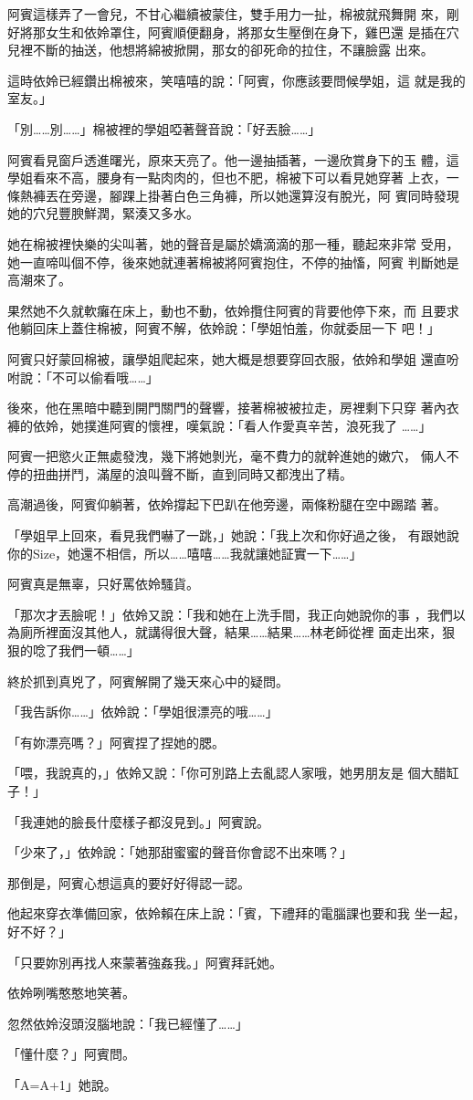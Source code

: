阿賓這樣弄了一會兒，不甘心繼續被蒙住，雙手用力一扯，棉被就飛舞開
來，剛好將那女生和依姈罩住，阿賓順便翻身，將那女生壓倒在身下，雞巴還
是插在穴兒裡不斷的抽送，他想將綿被掀開，那女的卻死命的拉住，不讓臉露
出來。

這時依姈已經鑽出棉被來，笑嘻嘻的說：「阿賓，你應該要問候學姐，這
就是我的室友。」

「別……別……」棉被裡的學姐啞著聲音說：「好丟臉……」

阿賓看見窗戶透進曙光，原來天亮了。他一邊抽插著，一邊欣賞身下的玉
體，這學姐看來不高，腰身有一點肉肉的，但也不肥，棉被下可以看見她穿著
上衣，一條熱褲丟在旁邊，腳踝上掛著白色三角褲，所以她還算沒有脫光，阿
賓同時發現她的穴兒豐腴鮮潤，緊湊又多水。

她在棉被裡快樂的尖叫著，她的聲音是屬於嬌滴滴的那一種，聽起來非常
受用，她一直啼叫個不停，後來她就連著棉被將阿賓抱住，不停的抽慉，阿賓
判斷她是高潮來了。

果然她不久就軟癱在床上，動也不動，依姈攬住阿賓的背要他停下來，而
且要求他躺回床上蓋住棉被，阿賓不解，依姈說：「學姐怕羞，你就委屈一下
吧！」

阿賓只好蒙回棉被，讓學姐爬起來，她大概是想要穿回衣服，依姈和學姐
還直吩咐說：「不可以偷看哦……」

後來，他在黑暗中聽到開門關門的聲響，接著棉被被拉走，房裡剩下只穿
著內衣褲的依姈，她撲進阿賓的懷裡，嘆氣說：「看人作愛真辛苦，浪死我了
……」

阿賓一把慾火正無處發洩，幾下將她剝光，毫不費力的就幹進她的嫩穴，
倆人不停的扭曲拼鬥，滿屋的浪叫聲不斷，直到同時又都洩出了精。

高潮過後，阿賓仰躺著，依姈撐起下巴趴在他旁邊，兩條粉腿在空中踢踏
著。

「學姐早上回來，看見我們嚇了一跳，」她說：「我上次和你好過之後，
有跟她說你的Size，她還不相信，所以……嘻嘻……我就讓她証實一下……」

阿賓真是無辜，只好罵依姈騷貨。

「那次才丟臉呢！」依姈又說：「我和她在上洗手間，我正向她說你的事
，我們以為廁所裡面沒其他人，就講得很大聲，結果……結果……林老師從裡
面走出來，狠狠的唸了我們一頓……」

終於抓到真兇了，阿賓解開了幾天來心中的疑問。

「我告訴你……」依姈說：「學姐很漂亮的哦……」

「有妳漂亮嗎？」阿賓捏了捏她的腮。

「喂，我說真的，」依姈又說：「你可別路上去亂認人家哦，她男朋友是
個大醋缸子！」

「我連她的臉長什麼樣子都沒見到。」阿賓說。

「少來了，」依姈說：「她那甜蜜蜜的聲音你會認不出來嗎？」

那倒是，阿賓心想這真的要好好得認一認。

他起來穿衣準備回家，依姈賴在床上說：「賓，下禮拜的電腦課也要和我
坐一起，好不好？」

「只要妳別再找人來蒙著強姦我。」阿賓拜託她。

依姈咧嘴憨憨地笑著。

忽然依姈沒頭沒腦地說：「我已經懂了……」

「懂什麼？」阿賓問。

「A=A+1」她說。











